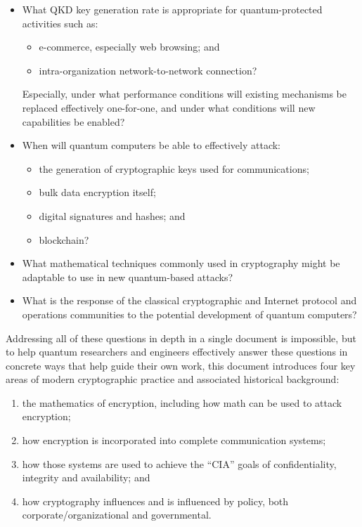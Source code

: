 \begin{itemize}
\item What QKD key generation rate is appropriate for
  quantum-protected activities such as:
  \begin{itemize}
  \item e-commerce, especially web browsing; and
  \item intra-organization network-to-network connection?
  \end{itemize}
  Especially, under what performance conditions will existing mechanisms
  be replaced effectively one-for-one, and under what conditions will new
  capabilities be enabled?
\item When will quantum computers be able to effectively attack:
  \begin{itemize}
  \item the generation of cryptographic keys used for communications;
  \item bulk data encryption itself;
  \item digital signatures and hashes; and
  \item blockchain?
  \end{itemize}
\item What mathematical techniques commonly used in cryptography might
  be adaptable to use in new quantum-based attacks?
\item What is the response of the classical cryptographic and Internet
  protocol and operations communities to the potential development of
  quantum computers?
\end{itemize}

Addressing all of these questions in depth in a single document is
impossible, but to help quantum researchers and engineers effectively
answer these questions in concrete ways that help guide their own
work, this document introduces four key areas of modern cryptographic
practice and associated historical background:

\begin{enumerate}
\item the mathematics of encryption, including how math can be used to
  attack encryption;
\item how encryption is incorporated into complete communication
  systems;
\item how those systems are used to achieve the ``CIA'' goals of
  confidentiality, integrity and availability; and
\item how cryptography influences and is influenced by policy, both
  corporate/organizational and governmental.
\end{enumerate}

